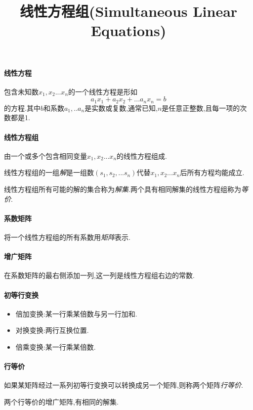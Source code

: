 \documentclass{ctexart}
\begin{document}
\title{线性方程组(Simultaneous Linear Equations)}
\maketitle


\paragraph{线性方程}
包含未知数$x_1,x_2...x_n$的一个线性方程是形如
$$a_1x_1+a_2x_2+...a_nx_n=b$$
的方程.其中$b$和系数$a_1,..a_n$是实数或复数,通常已知,$n$是任意正整数,且每一项的次数都是1.

\paragraph{线性方程组}
由一个或多个包含相同变量$x_1,x_2...x_n$的线性方程组成.

线性方程组的一组\emph{解}是一组数$(s_1,s_2,...s_n)$代替$x_1,x_2...x_n$后所有方程均能成立.

线性方程组所有可能的解的集合称为\emph{解集}.两个具有相同解集的线性方程组称为\emph{等价}.

\paragraph{系数矩阵}将一个线性方程组的所有系数用\emph{矩阵}表示.
\paragraph{增广矩阵}在系数矩阵的最右侧添加一列,这一列是线性方程组右边的常数.

\paragraph{初等行变换} 
\begin{itemize}
	\item 倍加变换:某一行乘某倍数与另一行加和.
	\item 对换变换:两行互换位置.
	\item 倍乘变换:某一行乘某倍数.
\end{itemize}

\paragraph{行等价}如果某矩阵经过一系列初等行变换可以转换成另一个矩阵,则称两个矩阵\emph{行等价}.

两个行等价的增广矩阵,有相同的解集.
	







	
\end{document}
